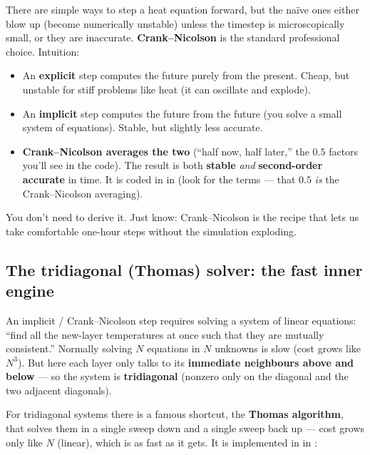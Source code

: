 There are simple ways to step a heat equation forward, but the na\"ive ones
either blow up (become numerically unstable) unless the timestep is
microscopically small, or they are inaccurate. \textbf{Crank--Nicolson} is the
standard professional choice. Intuition:
\begin{itemize}[leftmargin=1.4em,itemsep=3pt]
  \item An \textbf{explicit} step computes the future purely from the present.
    Cheap, but unstable for stiff problems like heat (it can oscillate and
    explode).
  \item An \textbf{implicit} step computes the future from the future (you solve
    a small system of equations). Stable, but slightly less accurate.
  \item \textbf{Crank--Nicolson averages the two} (``half now, half later,'' the
    $0.5$ factors you'll see in the code). The result is both \textbf{stable}
    \emph{and} \textbf{second-order accurate} in time. It is coded in
     in  (look for the 
    terms --- that $0.5$ \emph{is} the Crank--Nicolson averaging).
\end{itemize}

\begin{keyidea}
You don't need to derive it. Just know: Crank--Nicolson is the recipe that lets
us take comfortable one-hour steps without the simulation exploding.
\end{keyidea}

\subsection{The tridiagonal (Thomas) solver: the fast inner engine}
\label{sec:thomas}

An implicit / Crank--Nicolson step requires solving a system of linear
equations: ``find all the new-layer temperatures at once such that they are
mutually consistent.'' Normally solving $N$ equations in $N$ unknowns is slow
(cost grows like $N^3$). But here each layer only talks to its \textbf{immediate
neighbours above and below} --- so the system is \textbf{tridiagonal} (nonzero
only on the diagonal and the two adjacent diagonals).

For tridiagonal systems there is a famous shortcut, the \textbf{Thomas
algorithm}, that solves them in a single sweep down and a single sweep back up
--- cost grows only like $N$ (linear), which is as fast as it gets. It is
implemented in  in :

